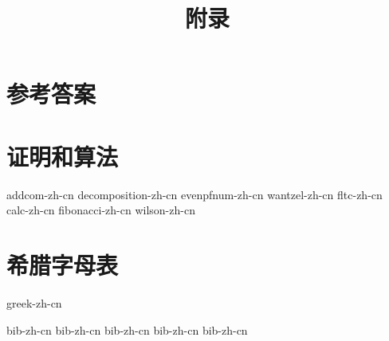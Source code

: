 \documentclass[b5paper]{ctexart}
\begin{document}
\title{附录}

\maketitle
\fi

\chapter{参考答案}
\label{ch:answers}
\shipoutAnswer

\chapter{证明和算法}

{addcom-zh-cn}
{decomposition-zh-cn}
{evenpfnum-zh-cn}
{wantzel-zh-cn}
{fltc-zh-cn}
{calc-zh-cn}
{fibonacci-zh-cn}
{wilson-zh-cn}

\chapter{希腊字母表} \label{ch:greek-letters}
{greek-zh-cn}

\markboth{\bibname}{}

\begin{thebibliography}{99}
  {bib-zh-cn}
  {bib-zh-cn}
  {bib-zh-cn}
  {bib-zh-cn}
  {bib-zh-cn}
\end{thebibliography}

\ifx\wholebook\relax \else
\expandafter\enddocument
\fi
\end{document}
